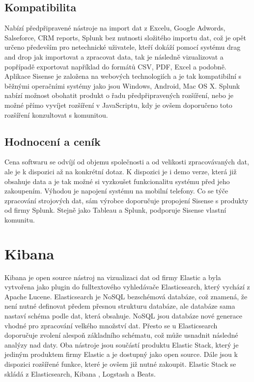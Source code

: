 \documentclass[czech,BP]{thesiskiv}
\begin{document}
 \subsection{Kompatibilita}
  Nabízí předpřipravené nástroje na import dat z Excelu, Google Adwords, Salseforce, CRM reports, Splunk bez nutnosti složitého importu dat, což je opět určeno především pro netechnické uživatele, kteří dokáží pomocí systému drag and drop jak importovat a zpracovat data, tak je následně vizualizovat a popřípadě exportovat například do formátů CSV, PDF, Excel a podobně. \cite{PDF} Aplikace Sisense je založena na webových technologiích a je tak kompatibilní s běžnými operačními systémy jako jsou Windows, Android, Mac OS X. Splunk nabízí možnost obohatit produkt o řadu předpřipravených rozšíření, nebo je možné  přímo vyvíjet rozšíření v JavaScriptu, kdy je ovšem doporučeno toto rozšíření konzultovat s komunitou.\cite{SisenseAdd-ons}
 \subsection{Hodnocení a ceník}
 Cena softwaru se odvíjí od objemu společnosti a od velikosti zpracovávaných dat, ale je k dispozici až na konkrétní dotaz. K dispozici je i demo verze, která již obsahuje data a je tak možné si vyzkoušet funkcionalitu systému před jeho zakoupením. Výhodou je napojení systému na mobilní telefony. Co se týče zpracování strojových dat, sám výrobce doporučuje propojení Sisense s produkty od firmy Splunk. Stejně jako Tableau a Splunk, podporuje Sisense vlastní komunitu.\cite{SisenseAndSplunk}
 
 
 
 \section{Kibana}
 Kibana je open source nástroj na vizualizaci dat od firmy Elastic a byla vytvořena jako plugin do fulltextového vyhledávače Elasticsearch, který vychází z Apache Lucene. Elasticsearch je NoSQL bezschémová databáze, což znamená, že není nutné definovat předem přesnou strukturu databáze, ale databáze sama nastaví schéma podle dat, která obsahuje. NoSQL jsou databáze nové generace vhodné pro zpracování velkého množství dat.\cite{NoSQL} Přesto se u Elasticsearch doporučuje zvolení alespoň základního schématu, což může usnadnit následné analýzy nad daty.\cite{SchemaElastic} Oba nástroje jsou součástí produktu Elastic Stack, který je jediným produktem firmy Elastic a je dostupný jako open source. Dále jsou k  dispozici rozšířené funkce, které je ovšem již nutné zakoupit. Elastic Stack se skládá z Elasticsearch, Kibana
 , Logstash a Beats.
 
\end{document}
